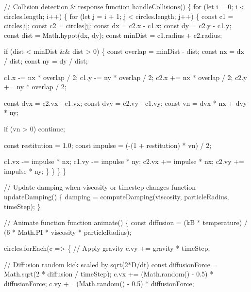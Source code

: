 \documentclass[
  letterpaper,
  enabledeprecatedfontcommands]{report}
\newenvironment{Shaded}{\begin{snugshade}}{\end{snugshade}}
\newcommand{\NormalTok}[1]{\textcolor[rgb]{0.00,0.23,0.31}{#1}}
\begin{document}
\begin{Shaded}
\begin{Highlighting}[]
\NormalTok{// Collision detection \& response}
\NormalTok{function handleCollisions() \{}
\NormalTok{  for (let i = 0; i \textless{} circles.length; i++) \{}
\NormalTok{    for (let j = i + 1; j \textless{} circles.length; j++) \{}
\NormalTok{      const c1 = circles[i];}
\NormalTok{      const c2 = circles[j];}
\NormalTok{      const dx = c2.x {-} c1.x;}
\NormalTok{      const dy = c2.y {-} c1.y;}
\NormalTok{      const dist = Math.hypot(dx, dy);}
\NormalTok{      const minDist = c1.radius + c2.radius;}

\NormalTok{      if (dist \textless{} minDist \&\& dist \textgreater{} 0) \{}
\NormalTok{        const overlap = minDist {-} dist;}
\NormalTok{        const nx = dx / dist;}
\NormalTok{        const ny = dy / dist;}

\NormalTok{        c1.x {-}= nx * overlap / 2;}
\NormalTok{        c1.y {-}= ny * overlap / 2;}
\NormalTok{        c2.x += nx * overlap / 2;}
\NormalTok{        c2.y += ny * overlap / 2;}

\NormalTok{        const dvx = c2.vx {-} c1.vx;}
\NormalTok{        const dvy = c2.vy {-} c1.vy;}
\NormalTok{        const vn = dvx * nx + dvy * ny;}

\NormalTok{        if (vn \textgreater{} 0) continue;}

\NormalTok{        const restitution = 1.0;}
\NormalTok{        const impulse = ({-}(1 + restitution) * vn) / 2;}

\NormalTok{        c1.vx {-}= impulse * nx;}
\NormalTok{        c1.vy {-}= impulse * ny;}
\NormalTok{        c2.vx += impulse * nx;}
\NormalTok{        c2.vy += impulse * ny;}
\NormalTok{      \}}
\NormalTok{    \}}
\NormalTok{  \}}
\NormalTok{\}}

\NormalTok{// Update damping when viscosity or timestep changes}
\NormalTok{function updateDamping() \{}
\NormalTok{  damping = computeDamping(viscosity, particleRadius, timeStep);}
\NormalTok{\}}

\NormalTok{// Animate function}
\NormalTok{function animate() \{}
\NormalTok{  const diffusion = (kB * temperature) / (6 * Math.PI * viscosity * particleRadius);}

\NormalTok{  circles.forEach(c =\textgreater{} \{}
\NormalTok{    // Apply gravity}
\NormalTok{    c.vy += gravity * timeStep;}

\NormalTok{    // Diffusion random kick scaled by sqrt(2*D/dt)}
\NormalTok{    const diffusionForce = Math.sqrt(2 * diffusion / timeStep);}
\NormalTok{    c.vx += (Math.random() {-} 0.5) * diffusionForce;}
\NormalTok{    c.vy += (Math.random() {-} 0.5) * diffusionForce;}


\end{Highlighting}
\end{Shaded}
\end{document}
